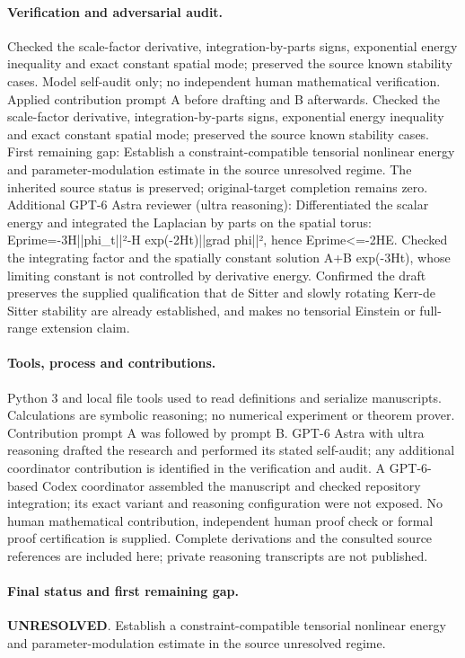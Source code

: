\documentclass[11pt]{article}
\begin{document}
\paragraph{Verification and adversarial audit.}
Checked the scale-factor derivative, integration-by-parts signs, exponential energy inequality and exact constant spatial mode; preserved the source known stability cases. Model self-audit only; no independent human mathematical verification. Applied contribution prompt A before drafting and B afterwards. Checked the scale-factor derivative, integration-by-parts signs, exponential energy inequality and exact constant spatial mode; preserved the source known stability cases. First remaining gap: Establish a constraint-compatible tensorial nonlinear energy and parameter-modulation estimate in the source unresolved regime. The inherited source status is preserved; original-target completion remains zero. Additional GPT-6 Astra reviewer (ultra reasoning): Differentiated the scalar energy and integrated the Laplacian by parts on the spatial torus: Eprime=-3H||phi\_t||²-H exp(-2Ht)||grad phi||², hence Eprime<=-2HE. Checked the integrating factor and the spatially constant solution A+B exp(-3Ht), whose limiting constant is not controlled by derivative energy. Confirmed the draft preserves the supplied qualification that de Sitter and slowly rotating Kerr-de Sitter stability are already established, and makes no tensorial Einstein or full-range extension claim.

\paragraph{Tools, process and contributions.}
Python 3 and local file tools used to read definitions and serialize manuscripts. Calculations are symbolic reasoning; no numerical experiment or theorem prover. Contribution prompt A was followed by prompt B. GPT-6 Astra with ultra reasoning drafted the research and performed its stated self-audit; any additional coordinator contribution is identified in the verification and audit. A GPT-6-based Codex coordinator assembled the manuscript and checked repository integration; its exact variant and reasoning configuration were not exposed. No human mathematical contribution, independent human proof check or formal proof certification is supplied. Complete derivations and the consulted source references are included here; private reasoning transcripts are not published.

\paragraph{Final status and first remaining gap.}
\textbf{UNRESOLVED}. Establish a constraint-compatible tensorial nonlinear energy and parameter-modulation estimate in the source unresolved regime.
\end{document}
